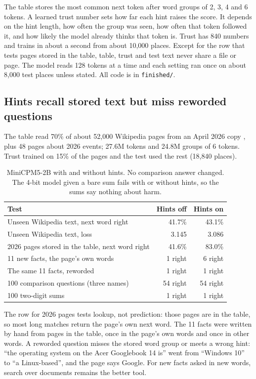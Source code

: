 \documentclass[11pt]{article}
\begin{document}
The table stores the most common next token after word groups of 2, 3, 4 and 6 tokens. A learned trust number sets how far each hint raises the score. It depends on the hint length, how often the group was seen, how often that token followed it, and how likely the model already thinks that token is. Trust has 840 numbers and trains in about a second from about 10,000 places. Except for the row that tests pages stored in the table, table, trust and test text never share a file or page. The model reads 128 tokens at a time and each setting ran once on about 8,000 test places unless stated. All code is in \texttt{finished/}.

\subsection{Hints recall stored text but miss reworded questions}
The table read 70\% of about 52,000 Wikipedia pages from an April 2026 copy \cite{wikicopy}, plus 48 pages about 2026 events; 27.6M tokens and 24.8M groups of 6 tokens. Trust trained on 15\% of the pages and the test used the rest (18,840 places).

\begin{table}[h]\centering\small
\begin{tabular}{lrr}\toprule
Test & Hints off & Hints on\\\midrule
Unseen Wikipedia text, next word right & 41.7\% & 43.1\%\\
Unseen Wikipedia text, loss & 3.145 & 3.086\\
2026 pages stored in the table, next word right & 41.6\% & 83.0\%\\
11 new facts, the page's own words & 1 right & 6 right\\
The same 11 facts, reworded & 1 right & 1 right\\
100 comparison questions (three names) & 54 right & 54 right\\
100 two-digit sums & 1 right & 1 right\\
\bottomrule\end{tabular}
\caption{MiniCPM5-2B with and without hints. No comparison answer changed. The 4-bit model given a bare sum fails with or without hints, so the sums say nothing about harm.}\label{tab:finished}
\end{table}

The row for 2026 pages tests lookup, not prediction: those pages are in the table, so most long matches return the page's own next word. The 11 facts were written by hand from pages in the table, once in the page's own words and once in other words. A reworded question misses the stored word group or meets a wrong hint: ``the operating system on the Acer Googlebook 14 is'' went from ``Windows 10'' to ``a Linux-based'', and the page says Google. For new facts asked in new words, search over documents remains the better tool.
\end{document}
